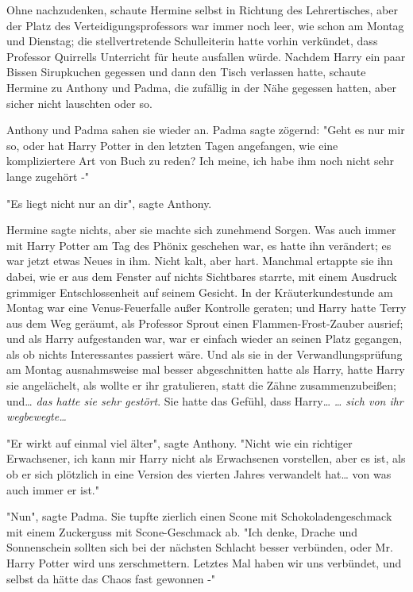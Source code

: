 {Ohne nachzudenken, schaute Hermine selbst in Richtung des Lehrertisches, aber der Platz des Verteidigungsprofessors war immer noch leer, wie schon am Montag und Dienstag; die stellvertretende Schulleiterin hatte vorhin verkündet, dass Professor Quirrells Unterricht für heute ausfallen würde. Nachdem Harry ein paar Bissen Sirupkuchen gegessen und dann den Tisch verlassen hatte, schaute Hermine zu Anthony und Padma, die zufällig in der Nähe gegessen hatten, aber sicher nicht lauschten oder so.

Anthony und Padma sahen sie wieder an. Padma sagte zögernd: "Geht es nur mir so, oder hat Harry Potter in den letzten Tagen angefangen, wie eine kompliziertere Art von Buch zu reden? Ich meine, ich habe ihm noch nicht sehr lange zugehört -"

"Es liegt nicht nur an dir", sagte Anthony.

Hermine sagte nichts, aber sie machte sich zunehmend Sorgen. Was auch immer mit Harry Potter am Tag des Phönix geschehen war, es hatte ihn verändert; es war jetzt etwas Neues in ihm. Nicht kalt, aber hart. Manchmal ertappte sie ihn dabei, wie er aus dem Fenster auf nichts Sichtbares starrte, mit einem Ausdruck grimmiger Entschlossenheit auf seinem Gesicht. In der Kräuterkundestunde am Montag war eine Venus-Feuerfalle außer Kontrolle geraten; und Harry hatte Terry aus dem Weg geräumt, als Professor Sprout einen Flammen-Frost-Zauber ausrief; und als Harry aufgestanden war, war er einfach wieder an seinen Platz gegangen, als ob nichts Interessantes passiert wäre. Und als sie in der Verwandlungsprüfung am Montag ausnahmsweise mal besser abgeschnitten hatte als Harry, hatte Harry sie angelächelt, als wollte er ihr gratulieren, statt die Zähne zusammenzubeißen; und… \emph{das hatte sie sehr gestört}. Sie hatte das Gefühl, dass Harry… \emph{… sich von ihr wegbewegte…}

"Er wirkt auf einmal viel älter", sagte Anthony. "Nicht wie ein richtiger Erwachsener, ich kann mir Harry nicht als Erwachsenen vorstellen, aber es ist, als ob er sich plötzlich in eine Version des vierten Jahres verwandelt hat… von was auch immer er ist."

"Nun", sagte Padma. Sie tupfte zierlich einen Scone mit Schokoladengeschmack mit einem Zuckerguss mit Scone-Geschmack ab. "Ich denke, Drache und Sonnenschein sollten sich bei der nächsten Schlacht besser verbünden, oder Mr. Harry Potter wird uns zerschmettern. Letztes Mal haben wir uns verbündet, und selbst da hätte das Chaos fast gewonnen -"

}
